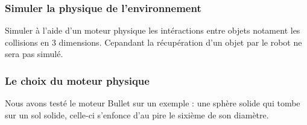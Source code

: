 \subsubsection{Simuler la physique de l'environnement}
Simuler à l'aide d'un moteur physique les intéractions entre objets notament les collisions en 3 dimensions. Cepandant la récupération d'un objet par le robot ne sera pas simulé.

\subsubsection{Le choix du moteur physique}
Nous avons testé le moteur Bullet sur un exemple : une sphère solide qui tombe sur un sol solide, celle-ci s'enfonce d'au pire le sixième de son diamètre. 


